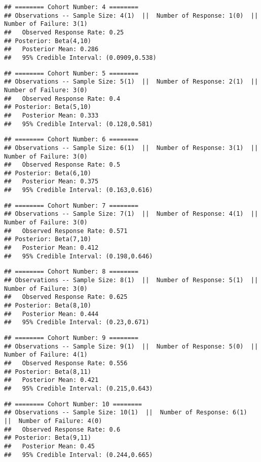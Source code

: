 \documentclass[]{article}
\begin{document}
\begin{verbatim}
## ======== Cohort Number: 4 ======== 
## Observations -- Sample Size: 4(1)  ||  Number of Response: 1(0)  ||  Number of Failure: 3(1)
##   Observed Response Rate: 0.25
## Posterior: Beta(4,10) 
##   Posterior Mean: 0.286
##   95% Credible Interval: (0.0909,0.538)
\end{verbatim}

\begin{verbatim}
## ======== Cohort Number: 5 ======== 
## Observations -- Sample Size: 5(1)  ||  Number of Response: 2(1)  ||  Number of Failure: 3(0)
##   Observed Response Rate: 0.4
## Posterior: Beta(5,10) 
##   Posterior Mean: 0.333
##   95% Credible Interval: (0.128,0.581)
\end{verbatim}

\begin{verbatim}
## ======== Cohort Number: 6 ======== 
## Observations -- Sample Size: 6(1)  ||  Number of Response: 3(1)  ||  Number of Failure: 3(0)
##   Observed Response Rate: 0.5
## Posterior: Beta(6,10) 
##   Posterior Mean: 0.375
##   95% Credible Interval: (0.163,0.616)
\end{verbatim}

\begin{verbatim}
## ======== Cohort Number: 7 ======== 
## Observations -- Sample Size: 7(1)  ||  Number of Response: 4(1)  ||  Number of Failure: 3(0)
##   Observed Response Rate: 0.571
## Posterior: Beta(7,10) 
##   Posterior Mean: 0.412
##   95% Credible Interval: (0.198,0.646)
\end{verbatim}

\begin{verbatim}
## ======== Cohort Number: 8 ======== 
## Observations -- Sample Size: 8(1)  ||  Number of Response: 5(1)  ||  Number of Failure: 3(0)
##   Observed Response Rate: 0.625
## Posterior: Beta(8,10) 
##   Posterior Mean: 0.444
##   95% Credible Interval: (0.23,0.671)
\end{verbatim}

\begin{verbatim}
## ======== Cohort Number: 9 ======== 
## Observations -- Sample Size: 9(1)  ||  Number of Response: 5(0)  ||  Number of Failure: 4(1)
##   Observed Response Rate: 0.556
## Posterior: Beta(8,11) 
##   Posterior Mean: 0.421
##   95% Credible Interval: (0.215,0.643)
\end{verbatim}

\begin{verbatim}
## ======== Cohort Number: 10 ======== 
## Observations -- Sample Size: 10(1)  ||  Number of Response: 6(1)  ||  Number of Failure: 4(0)
##   Observed Response Rate: 0.6
## Posterior: Beta(9,11) 
##   Posterior Mean: 0.45
##   95% Credible Interval: (0.244,0.665)
\end{verbatim}
\end{document}
